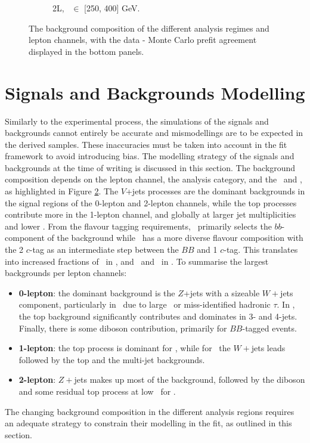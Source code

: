 \begin{figure}[h!]
{\begin{subfigure}[b]{0.37\textwidth}
            \caption{2L, \ptv\ $\in$ [250, 400] GeV.}
            \label{fig:backCom_2L_3}
        \end{subfigure} 
    }
    \caption{The background composition of the different analysis regimes and lepton channels, with the data - Monte Carlo prefit agreement displayed in the bottom panels.}
    \label{fig:backCom}
\end{figure} 

\section{Signals and Backgrounds Modelling}\label{sec-mod}
Similarly to the experimental process, the simulations of the signals and backgrounds cannot entirely be accurate and mismodellings are to be expected in the derived samples. These inaccuracies must be taken into account in the fit framework to avoid introducing bias. The modelling strategy of the signals and backgrounds at the time of writing is discussed in this section. The background composition depends on the lepton channel, the analysis category, and the \ptv\ and \nj, as highlighted in Figure \ref{fig:backCom}. The $V$+jets processes are the dominant backgrounds in the signal regions of the 0-lepton and 2-lepton channels, while the top processes contribute more in the 1-lepton channel, and globally at larger jet multiplicities and lower \ptv. From the flavour tagging requirements, \vhb\ primarily selects the $bb$-component of the background while \vhc\ has a more diverse flavour composition with the 2 $c$-tag as an intermediate step between the $BB$ and 1 $c$-tag. This translates into increased fractions of \vhf\ in \vhb, and \vmf\ and \vlf\ in \vhc. To summarise the largest backgrounds per lepton channels:
\begin{itemize}[leftmargin=*]
    \item \textbf{0-lepton}: the dominant background is the $Z$+jets with a sizeable $W+$jets component, particularly in \vhc\ due to large \etm\ or miss-identified hadronic $\tau$. In \vhb, the top background significantly contributes and dominates in 3- and 4-jets. Finally, there is some diboson contribution, primarily for $BB$-tagged events.
    \item \textbf{1-lepton}: the top process is dominant for \vhb, while for \vhc\ the $W+$jets leads followed by the top and the multi-jet backgrounds.  
    \item \textbf{2-lepton}: $Z+$jets makes up most of the background, followed by the diboson and some residual top process at low \ptv\ for \vhb. 
\end{itemize}
The changing background composition in the different analysis regions requires an adequate strategy to constrain their modelling in the fit, as outlined in this section.
  
